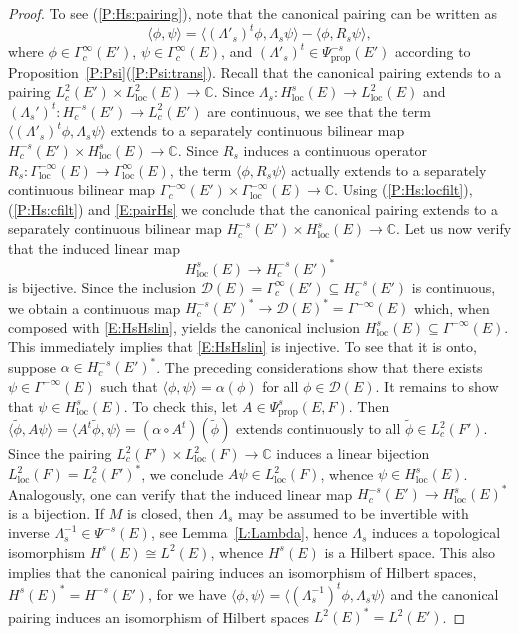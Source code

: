 \documentclass[reqno,12pt]{amsart}
\newcommand\C{\mathbb C}
\newcommand\prop{\textrm{prop}}
\newcommand\loc{\textrm{loc}}
\newcommand\itemref[1]{(\ref{#1})}
\theoremstyle{plain}
\theoremstyle{definition}
\begin{document}
\begin{proof}
To see \itemref{P:Hs:pairing},
note that the canonical pairing can be written as
\begin{equation}\label{E:pairHs}
\langle\phi,\psi\rangle
=\langle(\Lambda'_s)^t\phi,\Lambda_s\psi\rangle
-\langle\phi,R_s\psi\rangle,
\end{equation}
where $\phi\in\Gamma^\infty_c(E')$, $\psi\in\Gamma^\infty_c(E)$, and
$(\Lambda'_s)^t\in\Psi^{-s}_\prop(E')$ according to Proposition~\ref{P:Psi}\itemref{P:Psi:trans}.
Recall that the canonical pairing extends to a pairing $L^2_c(E')\times L^2_\loc(E)\to\C$.
Since $\Lambda_s\colon H^s_\loc(E)\to L^2_\loc(E)$ and $(\Lambda_s')^t\colon H^{-s}_c(E')\to L^2_c(E')$ are continuous, we see that the term $\langle(\Lambda'_s)^t\phi,\Lambda_s\psi\rangle$ extends to a separately continuous bilinear map $H^{-s}_c(E')\times H^s_\loc(E)\to\C$.
Since $R_s$ induces a continuous operator $R_s\colon\Gamma^{-\infty}_\loc(E)\to\Gamma^\infty_\loc(E)$, the term $\langle\phi,R_s\psi\rangle$ actually extends to a separately continuous bilinear map $\Gamma^{-\infty}_c(E')\times\Gamma^{-\infty}_\loc(E)\to\C$.
Using \itemref{P:Hs:locfilt}, \itemref{P:Hs:cfilt} and \eqref{E:pairHs} we conclude that the canonical pairing extends to a separately continuous bilinear map $H^{-s}_c(E')\times H^s_\loc(E)\to\C$.
Let us now verify that the induced linear map
\begin{equation}\label{E:HsHslin}
H^s_\loc(E)\to H^{-s}_c(E')^*
\end{equation}
is bijective.
Since the inclusion $\mathcal D(E)=\Gamma^\infty_c(E')\subseteq H^{-s}_c(E')$ is continuous, we obtain a continuous map $H^{-s}_c(E')^*\to\mathcal D(E)^*=\Gamma^{-\infty}(E)$ which, when composed with \eqref{E:HsHslin}, yields the canonical inclusion $H^s_\loc(E)\subseteq\Gamma^{-\infty}(E)$. This immediately implies that \eqref{E:HsHslin} is injective.
To see that it is onto, suppose $\alpha\in H^{-s}_c(E')^*$.
The preceding considerations show that there exists $\psi\in\Gamma^{-\infty}(E)$ such that $\langle\phi,\psi\rangle=\alpha(\phi)$ for all $\phi\in\mathcal D(E)$.
It remains to show that $\psi\in H^s_\loc(E)$.
To check this, let $A\in\Psi^s_\prop(E,F)$.
Then $\langle\tilde\phi,A\psi\rangle=\langle A^t\tilde\phi,\psi\rangle=(\alpha\circ A^t)(\tilde\phi)$ extends continuously to all $\tilde\phi\in L^2_c(F')$.
Since the pairing $L^2_c(F')\times L^2_\loc(F)\to\C$ induces a linear bijection $L^2_\loc(F)=L^2_c(F')^*$, we conclude $A\psi\in L^2_\loc(F)$, whence $\psi\in H^s_\loc(E)$.
Analogously, one can verify that the induced linear map $H^{-s}_c(E')\to H^s_\loc(E)^*$ is a bijection.
If $M$ is closed, then $\Lambda_s$ may be assumed to be invertible with inverse $\Lambda_s^{-1}\in\Psi^{-s}(E)$, see Lemma~\ref{L:Lambda}, hence $\Lambda_s$ induces a topological isomorphism $H^s(E)\cong L^2(E)$, whence $H^s(E)$ is a Hilbert space.
This also implies that the canonical pairing induces an isomorphism of Hilbert spaces, $H^s(E)^*=H^{-s}(E')$, for we have $\langle\phi,\psi\rangle=\langle(\Lambda_s^{-1})^t\phi,\Lambda_s\psi\rangle$ and the canonical pairing induces an isomorphism of Hilbert spaces $L^2(E)^*=L^2(E')$.



\end{proof}
\end{document}
